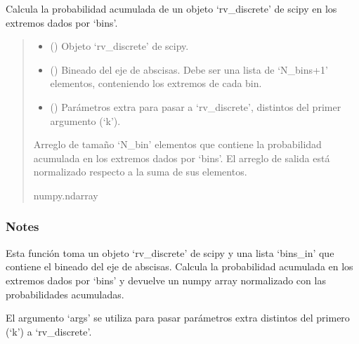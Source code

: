 \documentclass[letterpaper,10pt,english]{sphinxmanual}
\begin{document}

\begin{fulllineitems}
\label{\detokenize{utils.stats:utils.stats.bin_rv_discrete}}
\pysigstartsignatures
{}
\pysigstopsignatures
\sphinxAtStartPar
Calcula la probabilidad acumulada de un objeto ‘rv\_discrete’ de scipy en los extremos dados por ‘bins’.
\begin{quote}\begin{description}
\begin{itemize}
\item {} 
\sphinxAtStartPar
{} () \textendash{} Objeto ‘rv\_discrete’ de scipy.

\item {} 
\sphinxAtStartPar
{} () \textendash{} Bineado del eje de abscisas. Debe ser una lista de ‘N\_bins+1’ elementos, conteniendo los extremos de cada bin.

\item {} 
\sphinxAtStartPar
{} (\sphinxstyleliteralemphasis{\sphinxupquote{, }}) \textendash{} Parámetros extra para pasar a ‘rv\_discrete’, distintos del primer argumento (‘k’).

\end{itemize}

\sphinxAtStartPar
Arreglo de tamaño ‘N\_bin’ elementos que contiene la probabilidad acumulada en los extremos dados por ‘bins’.
El arreglo de salida está normalizado respecto a la suma de sus elementos.

\sphinxAtStartPar
numpy.ndarray

\end{description}\end{quote}
\subsubsection*{Notes}

\sphinxAtStartPar
Esta función toma un objeto ‘rv\_discrete’ de scipy y una lista ‘bins\_in’ que contiene el bineado del eje de abscisas.
Calcula la probabilidad acumulada en los extremos dados por ‘bins’ y devuelve un numpy array normalizado con las probabilidades acumuladas.

\sphinxAtStartPar
El argumento ‘args’ se utiliza para pasar parámetros extra distintos del primero (‘k’) a ‘rv\_discrete’.

\end{fulllineitems}
\end{document}
